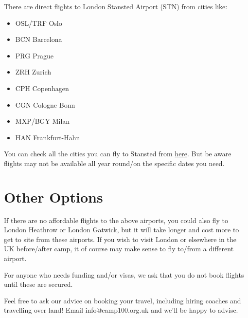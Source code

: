 \documentclass[a4paper, 11pt]{article}
\begin{document}
There are direct flights to London Stansted Airport (STN) from cities like:
\begin{multicols}{2}
    \begin{itemize}
        \item OSL/TRF Oslo 
        \item BCN Barcelona 
        \item PRG Prague 
        \item ZRH Zurich 
        \item CPH Copenhagen
        \item CGN Cologne Bonn
        \item MXP/BGY Milan
        \item HAN Frankfurt-Hahn 
    \end{itemize}
\end{multicols}
You can check all the cities you can fly to Stansted from \href{https://www.stanstedairport.com/destinations-and-guides/a-z-list-of-destinations/}{here}. But be aware flights may not be available all year round/on the specific dates you need.

\section{Other Options}
If there are no affordable flights to the above airports, you could also fly to London Heathrow or London Gatwick, but it will take longer and cost more to get to site from these airports. If you wish to visit London or elsewhere in the UK before/after camp, it of course may make sense to fly to/from a different airport. 

For anyone who needs funding and/or visas, we ask that you do not book flights until these are secured. 

Feel free to ask our advice on booking your travel, including hiring coaches and travelling over land! Email info@camp100.org.uk and we'll be happy to advise.

\makedocumentbackpage
\end{document}
